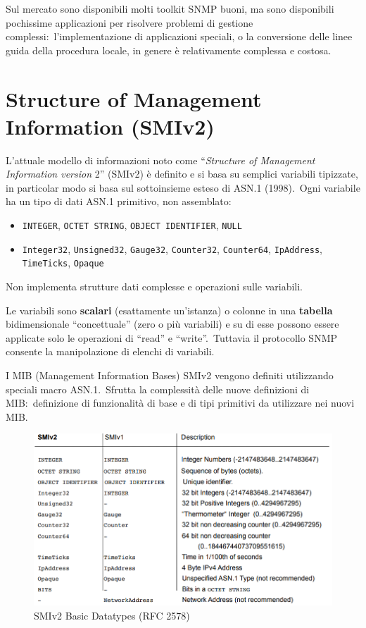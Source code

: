 Sul mercato sono disponibili molti toolkit SNMP buoni, ma sono disponibili pochissime applicazioni per risolvere problemi di gestione complessi:\ l'implementazione di applicazioni speciali, o la conversione delle linee guida della procedura locale, in genere è relativamente complessa e costosa.

\section{Structure of Management Information \- (SMIv2)}

L'attuale modello di informazioni noto come ``\textit{Structure of Management Information version} 2'' (SMIv2) è definito e si basa su semplici variabili tipizzate, in particolar modo si basa sul sottoinsieme esteso di ASN.1 (1998).\
Ogni variabile ha un tipo di dati ASN.1 primitivo, non assemblato:
\begin{itemize}
    \item \texttt{INTEGER}, \texttt{OCTET STRING}, \texttt{OBJECT IDENTIFIER}, \texttt{NULL}
    \item \texttt{Integer32}, \texttt{Unsigned32}, \texttt{Gauge32}, \texttt{Counter32}, \texttt{Counter64}, \texttt{Ip\-Ad\-dress}, \texttt{TimeTicks}, \texttt{Opaque}
\end{itemize}
Non implementa strutture dati complesse e operazioni sulle variabili.\

Le variabili sono \textbf{scalari} (esattamente un'istanza) o colonne in una \textbf{tabella} bidimensionale ``concettuale'' (zero o più variabili) e su di esse possono essere applicate solo le operazioni di ``read'' e ``write''.\ Tuttavia il protocollo SNMP consente la manipolazione di elenchi di variabili.

I MIB (Management Information Bases) SMIv2 vengono definiti utilizzando speciali macro ASN.1.\
Sfrutta la complessità delle nuove definizioni di MIB:\ definizione di funzionalità di base e di tipi primitivi da utilizzare nei nuovi MIB.

\begin{figure}[H]
    \centering
    \includegraphics[width=\textwidth]{immagini/SMIv2_Basic_Datatypes.png}
    \caption*{SMIv2 Basic Datatypes (RFC 2578)}
\end{figure}

